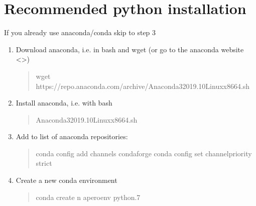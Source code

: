 \documentclass[a4paper,10pt,english]{report}
\begin{document}
\section{Recommended python installation}
\label{\detokenize{misc/pythoninstallation:recommended-python-installation}}\label{\detokenize{misc/pythoninstallation:python-installation}}\label{\detokenize{misc/pythoninstallation::doc}}
If you already use anaconda/conda skip to step 3
\begin{enumerate}
%
\item {} 
Download anaconda, i.e. in bash and wget (or go to the
anaconda website \textless{}\textgreater{})
\begin{quote}

\begin{sphinxVerbatim}[commandchars=\\\{\}]
wget https://repo.anaconda.com/archive/Anaconda3\PYGZhy{}2019.10\PYGZhy{}Linux\PYGZhy{}x86\PYGZus{}64.sh
\end{sphinxVerbatim}
\end{quote}

\item {} 
Install anaconda, i.e. with bash
\begin{quote}

\begin{sphinxVerbatim}[commandchars=\\\{\}]
Anaconda3\PYGZhy{}2019.10\PYGZhy{}Linux\PYGZhy{}x86\PYGZus{}64.sh
\end{sphinxVerbatim}
\end{quote}

\item {} 
Add  to list of anaconda repositories:
\begin{quote}

\begin{sphinxVerbatim}[commandchars=\\\{\}]
conda config \PYGZhy{}\PYGZhy{}add channels conda\PYGZhy{}forge
conda config \PYGZhy{}\PYGZhy{}set channel\PYGZus{}priority strict
\end{sphinxVerbatim}
\end{quote}

\item {} 
Create a new conda environment
\begin{quote}

\begin{sphinxVerbatim}[commandchars=\\\{\}]
conda create \PYGZhy{}n aperoenv \PYGZhy{}\PYGZhy{}python.7
\end{sphinxVerbatim}
\end{quote}


\end{enumerate}
\end{document}
